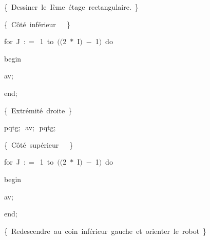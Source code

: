 {\vspace{\neglskip}\mbox{\blc  \blk\blk\blk\idt  \cmt  \{\ Dessiner\ le\ Ième\ étage\ rectangulaire.\ \}\idt }\par 
\vspace{\neglskip}\mbox{\blc  \blk\blk\blk\blk\blk\idt  \cmt  \{\ Côté\ inférieur\ \ \ \}\idt \ }\par 
\pagebreak[3] 
\vspace{\neglskip}\mbox{\blc  \blk\blk\blk\blk\blk\blk\blk\idt  \mcl for\idt \ J\ $:$$=$\ 1\ \mcl to\idt \ $($$($2\ $\ast$\ I$)$\ $-$\ 1$)$\ \mcl do\idt }\par 
\vspace{\neglskip}\mbox{\blc  \blk\blk\blk\blk\blk\blk\blk\blk\idt  \mcl begin\idt }\par 
\vspace{\neglskip}\mbox{\blc  \blk\blk\blk\blk\blk\blk\blk\blk\blk\idt  av$;$}\par 
\vspace{\neglskip}\mbox{\blc  \blk\blk\blk\blk\blk\blk\blk\blk\idt  \mcl end\idt $;$\ }\par 
\vspace{\neglskip}\mbox{\blc  \blk\blk\blk\blk\blk\idt  \cmt  \{\ Extrémité\ droite\ \}\idt }\par 
\vspace{\neglskip}\mbox{\blc  \blk\blk\blk\blk\blk\blk\blk\idt  pqtg$;$\ av$;$\ pqtg$;$\ }\par 
\vspace{\neglskip}\mbox{\blc  \blk\blk\blk\blk\blk\idt  \cmt  \{\ Côté\ supérieur\ \ \ \}\idt }\par 
\pagebreak[3] 
\vspace{\neglskip}\mbox{\blc  \blk\blk\blk\blk\blk\blk\blk\idt  \mcl for\idt \ J\ $:$$=$\ 1\ \mcl to\idt \ $($$($2\ $\ast$\ I$)$\ $-$\ 1$)$\ \mcl do\idt }\par 
\vspace{\neglskip}\mbox{\blc  \blk\blk\blk\blk\blk\blk\blk\blk\idt  \mcl begin\idt }\par 
\vspace{\neglskip}\mbox{\blc  \blk\blk\blk\blk\blk\blk\blk\blk\blk\idt  av$;$}\par 
\vspace{\neglskip}\mbox{\blc  \blk\blk\blk\blk\blk\blk\blk\blk\idt  \mcl end\idt $;$\ }\par 
\vspace{\neglskip}\mbox{\blc  \blk\blk\blk\idt  \cmt  \{\ Redescendre\ au\ coin\ inférieur\ gauche\ et\ orienter\ le\ robot\ \}\idt }\par 
}
